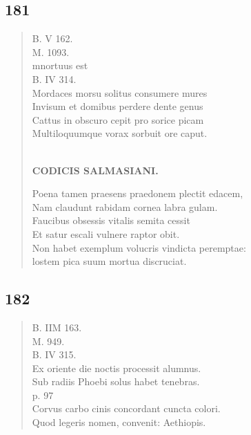 \documentclass[11pt, a4paper]{report}
\begin{document}
            \subsection*{181}
      \begin{verse}
      B. V 162. \\ M. 1093. \\ mnortuus est \\ B. IV 314. \\ Mordaces morsu solitus consumere mures \\ Invisum et domibus perdere dente genus \\ Cattus in obscuro cepit pro sorice picam \\ Multiloquumque vorax sorbuit ore caput. \\ 
        ﻿\pagebreak 
    \begin{center} \textbf{CODICIS SALMASIANI.} \end{center} \marginpar{[155]} Poena tamen praesens praedonem plectit edacem, \\ Nam claudunt rabidam cornea labra gulam. \\ Faucibus obsessis vitalis semita cessit \\ Et satur escali vulnere raptor obit. \\ Non habet exemplum volucris vindicta peremptae: \\ lostem pica suum mortua discruciat. \\ 
      \end{verse}
  
            \subsection*{182}
      \begin{verse}
      B. IIM 163. \\ M. 949. \\ B. IV 315. \\ Ex oriente die noctis processit alumnus. \\ Sub radiis Phoebi solus habet tenebras. \\ p. 97 \\ Corvus carbo cinis concordant cuncta colori. \\ Quod legeris nomen, convenit: Aethiopis. \\ 
      \end{verse}
  
\end{document}
